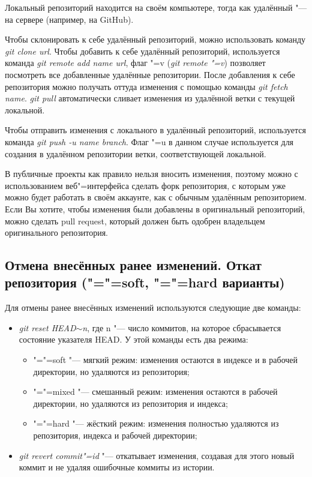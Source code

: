 \documentclass[12pt]{article}
\begin{document}
Локальный репозиторий находится на своём компьютере, тогда как удалённый "--- на сервере (например, на GitHub).

Чтобы склонировать к себе удалённый репозиторий, можно использовать команду \textit{git clone url}. Чтобы добавить к себе удалённый репозиторий, используется команда \textit{git remote add name url}, флаг "=v (\textit{git remote "=v}) позволяет посмотреть все добавленные удалённые репозитории. После добавления к себе репозитория можно получать оттуда изменения с помощью команды \textit{git fetch name}. \textit{git pull} автоматически сливает изменения из удалённой ветки с текущей локальной.

Чтобы отправить изменения с локального в удалённый репозиторий, используется команда \textit{git push -u name branch}. Флаг "=u в данном случае используется для создания в удалённом репозитории ветки, соответствующей локальной.

В публичные проекты как правило нельзя вносить изменения, поэтому можно с использованием веб"=интерфейса сделать форк репозитория, с которым уже можно будет работать в своём аккаунте, как с обычным удалённым репозиторием. Если Вы хотите, чтобы изменения были добавлены в оригинальный репозиторий, можно сделать pull request, который должен быть одобрен владельцем оригинального репозитория.

\subsection{Отмена внесённых ранее изменений. Откат репозитория ("="=soft, "="=hard варианты)}
Для отмены ранее внесённых изменений используются следующие две команды:
\begin{itemize}
\item \textit{git reset HEAD$\sim$n}, где n "--- число коммитов, на которое сбрасывается состояние указателя HEAD. У этой команды есть два режима:
	\begin{itemize}
	\item "="=soft "--- мягкий режим: изменения остаются в индексе и в рабочей директории, но удаляются из репозитория;
	\item "="=mixed "--- смешанный режим: изменения остаются в рабочей директории, но удаляются из репозитория и индекса;
	\item "="=hard "--- жёсткий режим: изменения полностью удаляются из репозитория, индекса и рабочей директории;
	\end{itemize}
\item \textit{git revert commit"=id} "--- откатывает изменения, создавая для этого новый коммит и не удаляя ошибочные коммиты из истории.
\end{itemize}
\end{document}

